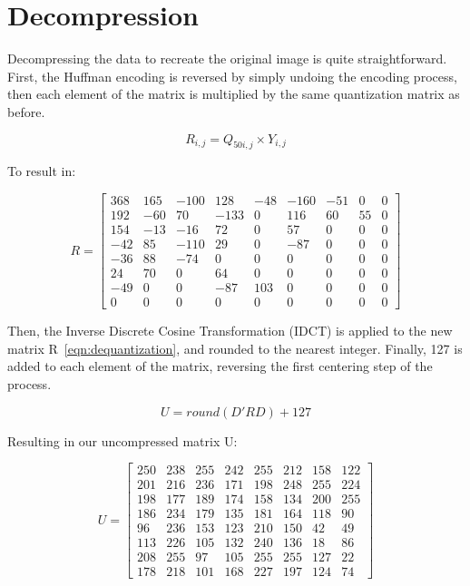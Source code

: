 \documentclass[11pt]{article}
\begin{document}
\section{Decompression}
\label{sec: decompression}

Decompressing the data to recreate the original image is quite straightforward.
First, the Huffman encoding is reversed by simply undoing the encoding process, then each element of the matrix is multiplied by the same quantization matrix as before.

\begin{equation}
  \label{eqn:decompression}
  R_{i,j} = Q_{50i,j} \times Y_{i,j}
\end{equation}

To result in:

\begin{equation}
  \label{eqn:dequantization}
  R = \begin{bmatrix}
    368 & 165 & -100 & 128 & -48 & -160 & -51 & 0 & 0 \\
    192 & -60 & 70 & -133 & 0 & 116 & 60 & 55 & 0 \\
    154 & -13 & -16 & 72 & 0 & 57 & 0 & 0 & 0 \\
    -42 & 85 & -110 & 29 & 0 & -87 & 0 & 0 & 0 \\
    -36 & 88 & -74 & 0 & 0 & 0 & 0 & 0 & 0 \\
    24 & 70 & 0 & 64 & 0 & 0 & 0 & 0 & 0 \\
    -49 & 0 & 0 & -87 & 103 & 0 & 0 & 0 & 0 \\
    0 & 0 & 0 & 0 & 0 & 0 & 0 & 0 & 0
  \end{bmatrix}
\end{equation}

Then, the Inverse Discrete Cosine Transformation (IDCT) is applied to the new matrix R~\eqref{eqn:dequantization}, and rounded to the nearest integer.
Finally, 127 is added to each element of the matrix, reversing the first centering step of the process.

\begin{equation}
  \label{eqn:idct}
  U = round(D'RD) + 127
\end{equation}

Resulting in our uncompressed matrix U:

\begin{equation}
  \label{eqn:decompressed}
  U = \begin{bmatrix}
    250 & 238 & 255 & 242 & 255 & 212 & 158 & 122 \\
    201 & 216 & 236 & 171 & 198 & 248 & 255 & 224 \\
    198 & 177 & 189 & 174 & 158 & 134 & 200 & 255 \\
    186 & 234 & 179 & 135 & 181 & 164 & 118 & 90 \\
    96 & 236 & 153 & 123 & 210 & 150 & 42 & 49 \\
    113 & 226 & 105 & 132 & 240 & 136 & 18 & 86 \\
    208 & 255 & 97 & 105 & 255 & 255 & 127 & 22 \\
    178 & 218 & 101 & 168 & 227 & 197 & 124 & 74
  \end{bmatrix}
\end{equation}
\end{document}
